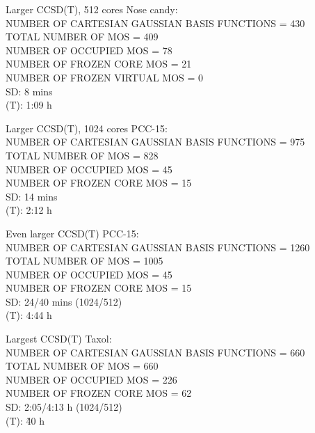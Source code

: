 \documentclass{beamer}
\begin{document}
\begin{frame}{Larger CCSD(T), 512 cores}
Nose candy: \\
 NUMBER OF CARTESIAN GAUSSIAN BASIS FUNCTIONS =  430 \\
 TOTAL NUMBER OF MOS          =   409 \\
 NUMBER OF OCCUPIED MOS       =    78 \\
 NUMBER OF FROZEN CORE MOS    =    21 \\
 NUMBER OF FROZEN VIRTUAL MOS =     0 \\
SD: 8 mins \\
(T): 1:09 h
 \end{frame}

\begin{frame}{Larger CCSD(T), 1024 cores}
PCC-15: \\
 NUMBER OF CARTESIAN GAUSSIAN BASIS FUNCTIONS =  975  \\
 TOTAL NUMBER OF MOS          =   828\\
 NUMBER OF OCCUPIED MOS       =    45\\
 NUMBER OF FROZEN CORE MOS    =    15\\
SD: 14 mins\\
(T): 2:12 h
\end{frame}

\begin{frame}{Even larger CCSD(T)}
PCC-15: \\
 NUMBER OF CARTESIAN GAUSSIAN BASIS FUNCTIONS =  1260  \\
 TOTAL NUMBER OF MOS          =   1005\\
 NUMBER OF OCCUPIED MOS       =    45\\
 NUMBER OF FROZEN CORE MOS    =    15\\
SD: 24/40 mins (1024/512)\\
(T): 4:44 h
\end{frame}

\begin{frame}{Largest CCSD(T)}
Taxol: \\
 NUMBER OF CARTESIAN GAUSSIAN BASIS FUNCTIONS =  660  \\
 TOTAL NUMBER OF MOS          =   660\\
 NUMBER OF OCCUPIED MOS       =    226\\
 NUMBER OF FROZEN CORE MOS    =    62\\
SD: 2:05/4:13 h (1024/512)\\
(T): \~ 40 h
\end{frame}
\end{document}
